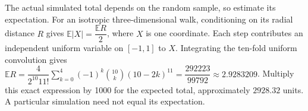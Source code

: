 The actual simulated total depends on the random sample, so estimate its expectation. For an isotropic three-dimensional walk, conditioning on its radial distance $R$ gives $\mathbb{E}|X|=\dfrac{\mathbb{E}R}{2}$, where $X$ is one coordinate. Each step contributes an independent uniform variable on $[-1,1]$ to $X$. Integrating the ten-fold uniform convolution gives $\mathbb{E}R=\dfrac{4}{2^{10}11!}\sum_{k=0}^4(-1)^k\binom{10}k(10-2k)^{11}=\dfrac{292223}{99792}\approx2.9283209$. Multiply this exact expression by 1000 for the expected total, approximately $\boxed{2928.32}$ units. A particular simulation need not equal its expectation.
